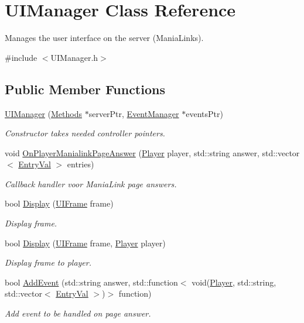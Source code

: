 \hypertarget{classUIManager}{\section{U\-I\-Manager Class Reference}
\label{classUIManager}
}


Manages the user interface on the server (Mania\-Links).  




{\ttfamily \#include $<$U\-I\-Manager.\-h$>$}

\subsection*{Public Member Functions}
\begin{DoxyCompactItemize}
\item 
\hyperlink{classUIManager_a6bed011df535971bd1ee0e633219b126}{U\-I\-Manager} (\hyperlink{classMethods}{Methods} $\ast$server\-Ptr, \hyperlink{classEventManager}{Event\-Manager} $\ast$events\-Ptr)
\begin{DoxyCompactList}\small\item\em Constructor takes needed controller pointers. \end{DoxyCompactList}\item 
void \hyperlink{classUIManager_a79bae5bfa896f37455d10256caa8b95b}{On\-Player\-Manialink\-Page\-Answer} (\hyperlink{structPlayer}{Player} player, std\-::string answer, std\-::vector$<$ \hyperlink{structEntryVal}{Entry\-Val} $>$ entries)
\begin{DoxyCompactList}\small\item\em Callback handler voor Mania\-Link page answers. \end{DoxyCompactList}\item 
bool \hyperlink{classUIManager_a97f069a4a1c54f6e9569a194834e090c}{Display} (\hyperlink{structUIFrame}{U\-I\-Frame} frame)
\begin{DoxyCompactList}\small\item\em Display frame. \end{DoxyCompactList}\item 
bool \hyperlink{classUIManager_a83370680d61bea5a5464127a5f11b9a9}{Display} (\hyperlink{structUIFrame}{U\-I\-Frame} frame, \hyperlink{structPlayer}{Player} player)
\begin{DoxyCompactList}\small\item\em Display frame to player. \end{DoxyCompactList}\item 
bool \hyperlink{classUIManager_a094c102025f079fed26c67a336938582}{Add\-Event} (std\-::string answer, std\-::function$<$ void(\hyperlink{structPlayer}{Player}, std\-::string, std\-::vector$<$ \hyperlink{structEntryVal}{Entry\-Val} $>$)$>$ function)
\begin{DoxyCompactList}\small\item\em Add event to be handled on page answer. \end{DoxyCompactList}\end{DoxyCompactItemize}
